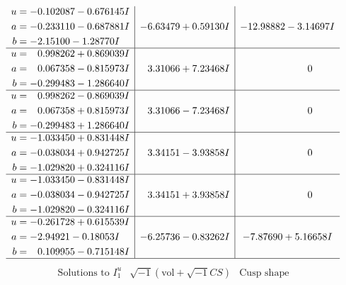 \documentclass[1p]{elsarticle_modified}
\theoremstyle{definition}
\newcommand{\I}{\sqrt{-1}}
\begin{document}
$$\begin{array}{c|c|c}
\begin{aligned}
u &= -0.102087 - 0.676145 I \\
a &= -0.233110 - 0.687881 I \\
b &= -2.15100 - 1.28770 I\end{aligned}
 & -6.63479 + 0.59130 I & -12.98882 - 3.14697 I \\ \hline\begin{aligned}
u &= \phantom{-}0.998262 + 0.869039 I \\
a &= \phantom{-}0.067358 - 0.815973 I \\
b &= -0.299483 - 1.286640 I\end{aligned}
 & \phantom{-}3.31066 + 7.23468 I & \phantom{-0.000000 } 0 \\ \hline\begin{aligned}
u &= \phantom{-}0.998262 - 0.869039 I \\
a &= \phantom{-}0.067358 + 0.815973 I \\
b &= -0.299483 + 1.286640 I\end{aligned}
 & \phantom{-}3.31066 - 7.23468 I & \phantom{-0.000000 } 0 \\ \hline\begin{aligned}
u &= -1.033450 + 0.831448 I \\
a &= -0.038034 + 0.942725 I \\
b &= -1.029820 + 0.324116 I\end{aligned}
 & \phantom{-}3.34151 - 3.93858 I & \phantom{-0.000000 } 0 \\ \hline\begin{aligned}
u &= -1.033450 - 0.831448 I \\
a &= -0.038034 - 0.942725 I \\
b &= -1.029820 - 0.324116 I\end{aligned}
 & \phantom{-}3.34151 + 3.93858 I & \phantom{-0.000000 } 0 \\ \hline\begin{aligned}
u &= -0.261728 + 0.615539 I \\
a &= -2.94921 - 0.18053 I \\
b &= \phantom{-}0.109955 - 0.715148 I\end{aligned}
 & -6.25736 - 0.83262 I & -7.87690 + 5.16658 I\\
 \hline 
 \end{array}$$\newpage$$\begin{array}{c|c|c}  
\text{Solutions to }I^u_{1}& \I (\text{vol} + \sqrt{-1}CS) & \text{Cusp shape}\\
 \hline 
\begin{aligned}

\end{aligned}
\end{array}$$
\end{document}
